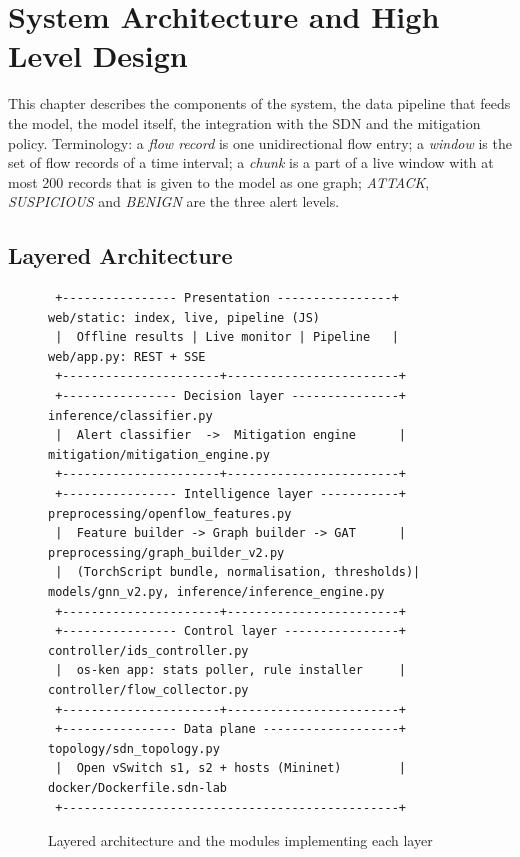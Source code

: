 
\chapter{System Architecture and High Level Design}

This chapter describes the components of the system, the data pipeline that feeds the model, the model itself, the integration with the SDN and the mitigation policy. Terminology: a \emph{flow record} is one unidirectional flow entry; a \emph{window} is the set of flow records of a time interval; a \emph{chunk} is a part of a live window with at most 200 records that is given to the model as one graph; \emph{ATTACK}, \emph{SUSPICIOUS} and \emph{BENIGN} are the three alert levels.\\

\section{Layered Architecture}

\begin{figure}[htbp]
\centering
\scriptsize
\begin{verbatim}
 +---------------- Presentation ----------------+   web/static: index, live, pipeline (JS)
 |  Offline results | Live monitor | Pipeline   |   web/app.py: REST + SSE
 +----------------------+------------------------+
 +---------------- Decision layer ---------------+   inference/classifier.py
 |  Alert classifier  ->  Mitigation engine      |   mitigation/mitigation_engine.py
 +----------------------+------------------------+
 +---------------- Intelligence layer -----------+   preprocessing/openflow_features.py
 |  Feature builder -> Graph builder -> GAT      |   preprocessing/graph_builder_v2.py
 |  (TorchScript bundle, normalisation, thresholds)|  models/gnn_v2.py, inference/inference_engine.py
 +----------------------+------------------------+
 +---------------- Control layer ----------------+   controller/ids_controller.py
 |  os-ken app: stats poller, rule installer     |   controller/flow_collector.py
 +----------------------+------------------------+
 +---------------- Data plane -------------------+   topology/sdn_topology.py
 |  Open vSwitch s1, s2 + hosts (Mininet)        |   docker/Dockerfile.sdn-lab
 +-----------------------------------------------+
\end{verbatim}
\caption{Layered architecture and the modules implementing each layer}
\label{fig:layers}
\end{figure}

